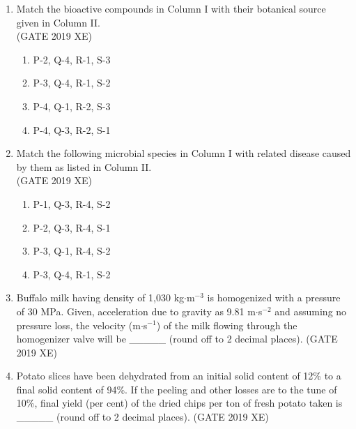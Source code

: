 \documentclass[journal,12pt,onecolumn]{IEEEtran}
\begin{document}
\begin{enumerate}
\item Match the bioactive compounds in Column I with their botanical source given in Column II.\\



\hfill{(GATE 2019 XE)} \\
\begin{multicols}{2}
\begin{enumerate}
\item P-2, Q-4, R-1, S-3
\item P-3, Q-4, R-1, S-2
\item P-4, Q-1, R-2, S-3
\item P-4, Q-3, R-2, S-1
\end{enumerate}
\end{multicols}


\item Match the following microbial species in Column I with related disease caused by them as listed in Column II.\\



\hfill{(GATE 2019 XE)} \\
\begin{multicols}{2}
\begin{enumerate}
\item P-1, Q-3, R-4, S-2
\item P-2, Q-3, R-4, S-1
\item P-3, Q-1, R-4, S-2
\item P-3, Q-4, R-1, S-2
\end{enumerate}
\end{multicols}


\item Buffalo milk having density of 1,030 kg$\cdot$m$^{-3}$ is homogenized with a pressure of 30 MPa. Given, acceleration due to gravity as 9.81 m$\cdot$s$^{-2}$ and assuming no pressure loss, the velocity (m$\cdot$s$^{-1}$) of the milk flowing through the homogenizer valve will be \_\_\_\_\_ (round off to 2 decimal places).
\hfill{(GATE 2019 XE)} \\


\item Potato slices have been dehydrated from an initial solid content of 12\% to a final solid content of 94\%. If the peeling and other losses are to the tune of 10\%, final yield (per cent) of the dried chips per ton of fresh potato taken is \_\_\_\_\_ (round off to 2 decimal places).
\hfill{(GATE 2019 XE)} \\



\end{enumerate}
\end{document}
